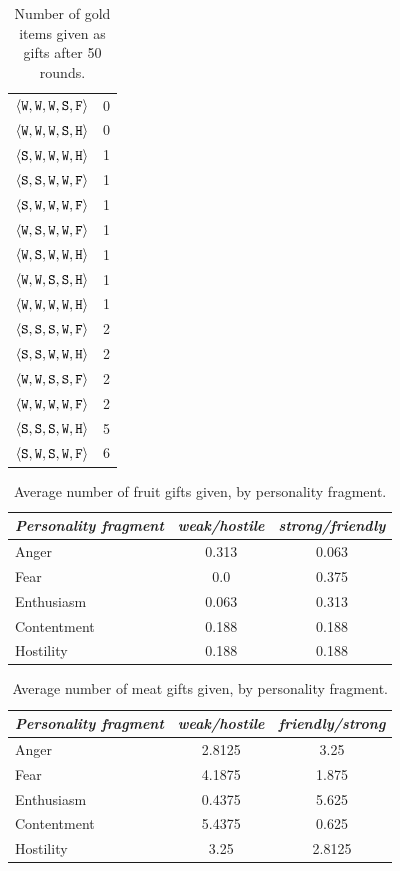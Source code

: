 \begin{table}
{{\begin{minipage}[b]{0.30\hsize}
\begin{tabular}{ l | c }
					$\langle \mathtt{W},\mathtt{W}, \mathtt{W}, \mathtt{S}, \mathtt{F} \rangle$ & 0\\
					$\langle \mathtt{W},\mathtt{W}, \mathtt{W}, \mathtt{S}, \mathtt{H} \rangle$ & 0\\
					$\langle \mathtt{S},\mathtt{W}, \mathtt{W}, \mathtt{W}, \mathtt{H} \rangle$ & 1\\
					$\langle \mathtt{S},\mathtt{S}, \mathtt{W}, \mathtt{W}, \mathtt{F} \rangle$ & 1\\
					$\langle \mathtt{S},\mathtt{W}, \mathtt{W}, \mathtt{W}, \mathtt{F} \rangle$ & 1\\
					$\langle \mathtt{W},\mathtt{S}, \mathtt{W}, \mathtt{W}, \mathtt{F} \rangle$ & 1\\
					$\langle \mathtt{W},\mathtt{S}, \mathtt{W}, \mathtt{W}, \mathtt{H} \rangle$ & 1\\
					$\langle \mathtt{W},\mathtt{W}, \mathtt{S}, \mathtt{S}, \mathtt{H} \rangle$ & 1\\
					$\langle \mathtt{W},\mathtt{W}, \mathtt{W}, \mathtt{W}, \mathtt{H} \rangle$ & 1\\
					$\langle \mathtt{S},\mathtt{S}, \mathtt{S}, \mathtt{W}, \mathtt{F} \rangle$ & 2\\
					$\langle \mathtt{S},\mathtt{S}, \mathtt{W}, \mathtt{W}, \mathtt{H} \rangle$ & 2\\
					$\langle \mathtt{W},\mathtt{W}, \mathtt{S}, \mathtt{S}, \mathtt{F} \rangle$ & 2\\
					$\langle \mathtt{W},\mathtt{W}, \mathtt{W}, \mathtt{W}, \mathtt{F} \rangle$ & 2\\
					$\langle \mathtt{S},\mathtt{S}, \mathtt{S}, \mathtt{W}, \mathtt{H} \rangle$ & 5\\
					$\langle \mathtt{S},\mathtt{W}, \mathtt{S}, \mathtt{W}, \mathtt{F} \rangle$ & 6\\
					\hline
				\end{tabular}
				\caption{Number of gold items given as gifts after 50 rounds.}
				\label{tab:numGoldGiven}
			\end{minipage}
			\hfill
		}}
\end{table}


\begin{table}
	\centering
	\begin{tabular}{ l | c | c }
		\emph{Personality fragment} & \emph{weak/hostile} & \emph{ strong/friendly} \\
		\hline
		Anger & 0.313 & 0.063\\
		Fear & 0.0 & 0.375\\
		Enthusiasm & 0.063 & 0.313\\
		Contentment & 0.188 & 0.188\\
		Hostility & 0.188 & 0.188\\
		\hline
	\end{tabular}
	\caption{Average number of fruit gifts given, by personality fragment.}
	\label{tab:numFruitGivenAvg}
\end{table}

\begin{table}
	\centering
	\begin{tabular}{ l | c | c }
		\emph{Personality fragment} & \emph{weak/hostile} & \emph{friendly/strong} \\
		\hline
			Anger & 2.8125 & 3.25\\
			Fear & 4.1875 & 1.875\\
			Enthusiasm & 0.4375 & 5.625\\
			Contentment & 5.4375 & 0.625\\
			Hostility & 3.25 & 2.8125\\
		\hline
	\end{tabular}
	\caption{Average number of meat gifts given, by personality fragment.}
	\label{tab:numMeatGivenAvg}
\end{table}

